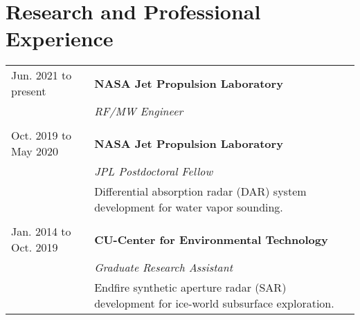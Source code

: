 \documentclass[letterpaper,12pt,oneside]{article}
\begin{document}
\section*{Research and Professional Experience}
\vspace*{-0.8\baselineskip}	
\begin{large}
	\begin{spacing}{.9}
		\noindent \begin{longtable}{@{} p{5cm}l}
			Jun. 2021 to present & \textbf{NASA Jet Propulsion Laboratory}\\
			& \textit{RF/MW Engineer}\\
			&\\
			Oct. 2019 to May 2020 & \textbf{NASA Jet Propulsion Laboratory}\\
			& \textit{JPL Postdoctoral Fellow}\\
			&\parbox{5.5in}{Differential absorption radar (DAR) system development for water vapor sounding.}\\
			&\\
			Jan. 2014 to Oct. 2019 & \textbf{CU-Center for Environmental Technology}\\
			& \textit{Graduate Research Assistant}\\
			& \parbox{5.5in}{Endfire synthetic aperture radar (SAR) development for ice-world subsurface exploration.}\\						
		\end{longtable}
	\end{spacing}
\end{large}

\end{document}
